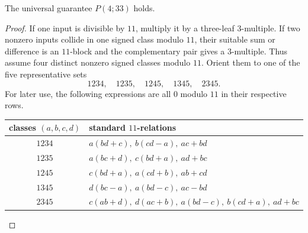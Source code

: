 \begin{theorem}\label{thm:p33}
The universal guarantee $P(4;33)$ holds.
\end{theorem}
\begin{proof}
If one input is divisible by $11$, multiply it by a three-leaf $3$-multiple.
If two nonzero inputs collide in one signed class modulo $11$, their suitable
sum or difference is an $11$-block and the complementary pair gives a
$3$-multiple.  Thus assume four distinct nonzero signed classes modulo $11$.
Orient them to one of the five representative sets
\[
 1234,\quad1235,\quad1245,\quad1345,\quad2345.
\]
For later use, the following expressions are all $0$ modulo $11$ in their
respective rows.
\small
\begin{center}
\begin{tabular}{@{}cl@{}}
\toprule
classes $(a,b,c,d)$ & standard $11$-relations \\
\midrule
$1234$&$a(bd+c),\ b(cd-a),\ ac+bd$\\
$1235$&$a(bc+d),\ c(bd+a),\ ad+bc$\\
$1245$&$c(bd+a),\ a(cd+b),\ ab+cd$\\
$1345$&$d(bc-a),\ a(bd-c),\ ac-bd$\\
$2345$&$c(ab+d),\ d(ac+b),\ a(bd-c),\ b(cd+a),\ ad+bc$\\
\bottomrule
\end{tabular}
\end{center}
\normalsize


\end{proof}
